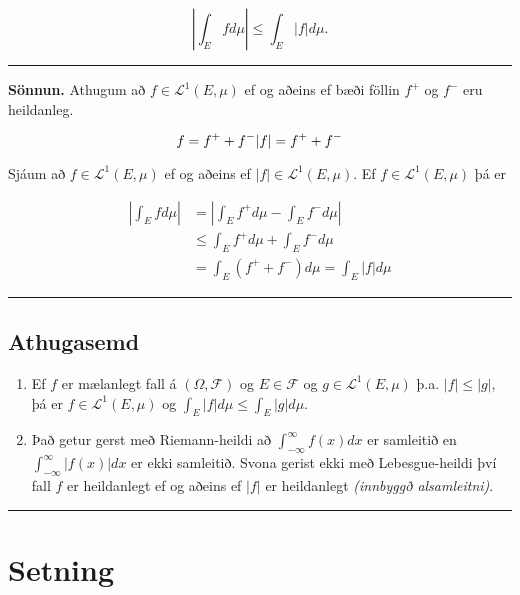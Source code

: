 \documentclass[]{book}
\begin{document}
\[
\left|\int_E fd\mu \right| \leq \int_E|f|d\mu.
\]

\begin{center}\rule{0.5\linewidth}{\linethickness}\end{center}

\textbf{Sönnun.} Athugum að \(f\in\mathcal L^1(E,\mu)\) ef og aðeins ef bæði föllin \(f^+\) og \(f^-\) eru heildanleg.

\[
f = f^+ + f^- \\
|f| = f^+ + f^-
\]

Sjáum að \(f\in\mathcal L^1(E,\mu)\) ef og aðeins ef \(|f|\in\mathcal L^1(E,\mu)\). Ef \(f\in\mathcal L^1(E,\mu)\) þá er

\[
\begin{aligned}
|\int_E fd\mu| &= |\int_E f^+d\mu - \int_E f^-d\mu| \\
&\leq \int_E f^+d\mu + \int_E f^-d\mu \\ 
&= \int_E(f^++f^-)d\mu = \int_E|f|d\mu
\end{aligned}
\]

\begin{center}\rule{0.5\linewidth}{\linethickness}\end{center}

\hypertarget{athugasemd-4}{%
\subsection{Athugasemd}\label{athugasemd-4}}

\begin{enumerate}
\def\labelenumi{\arabic{enumi}.}
\item
  Ef \(f\) er mælanlegt fall á \((\Omega, \mathcal F)\) og \(E\in\mathcal F\) og \(g\in \mathcal L^1(E,\mu)\) þ.a. \(|f|\leq |g|\), þá er \(f\in\mathcal L^1(E,\mu)\) og \(\int_E|f|d\mu \leq \int_E|g|d\mu\).
\item
  Það getur gerst með Riemann-heildi að \(\int_{-\infty}^\infty f(x)dx\) er samleitið en \(\int_{-\infty}^\infty|f(x)|dx\) er ekki samleitið. Svona gerist ekki með Lebesgue-heildi því fall \(f\) er heildanlegt ef og aðeins ef \(|f|\) er heildanlegt \emph{(innbyggð alsamleitni)}.
\end{enumerate}

\begin{center}\rule{0.5\linewidth}{\linethickness}\end{center}

\hypertarget{setning-51}{%
\section{Setning}\label{setning-51}}
\end{document}
